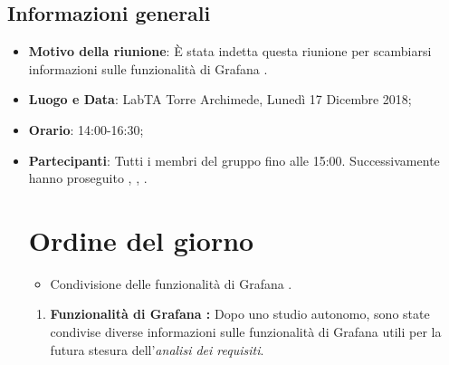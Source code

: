 \documentclass[12pt]{article}
\begin{document}
    \subsection{Informazioni generali}
    \begin{itemize}
        \item \textbf{Motivo della riunione}: È stata indetta questa riunione per scambiarsi informazioni sulle funzionalità di Grafana   \pedice.
        \item \textbf{Luogo e Data}: LabTA Torre Archimede, Lunedì 17 Dicembre 2018;
        \item \textbf{Orario}: 14:00-16:30;
        \item \textbf{Partecipanti}: Tutti i membri del gruppo fino alle 15:00. Successivamente hanno proseguito \daL, \daG, \mat.
        \newpage
        \section{Ordine del giorno}
        \begin{itemize}
        \item Condivisione delle funzionalità di Grafana \pedice .
        \end{itemize}
        
        \newpage
    \begin{enumerate}
    \section{Resoconto}
        \item \textbf{Funzionalità di Grafana \pedice:} Dopo uno studio autonomo, sono state condivise diverse informazioni sulle funzionalità di Grafana \pedice utili per la futura stesura dell'\textit{analisi dei requisiti}.
    \end{enumerate}

    \end{itemize}
\end{document}
